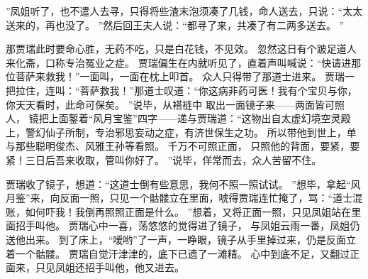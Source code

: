”凤姐听了，也不遣人去寻，只得将些渣末泡须凑了几钱，命人送去，只说：“太太送来的，再也没了。
”然后回王夫人说：“都寻了来，共凑了有二两多送去。
”\par
那贾瑞此时要命心胜，无药不吃，只是白花钱，不见效。
忽然这日有个跛足道人来化斋，口称专治冤业之症。
贾瑞偏生在内就听见了，直着声叫喊说：“快请进那位菩萨来救我！”一面叫，一面在枕上叩首。
众人只得带了那道士进来。
贾瑞一把拉住，连叫：“菩萨救我！”那道士叹道：“你这病非药可医！我有个宝贝与你，你天天看时，此命可保矣。
”说毕，从褡裢中
取出一面镜子来——两面皆可照人，
镜把上面錾着“风月宝鉴”四字——递与贾瑞道：“这物出自太虚幻境空灵殿上，警幻仙子所制，专治邪思妄动之症，有济世保生之功。
所以带他到世上，单与那些聪明俊杰、风雅王孙等看照。
千万不可照正面，
只照他的背面，要紧，要紧！三日后吾来收取，管叫你好了。
”说毕，佯常而去，众人苦留不住。
\par
贾瑞收了镜子，想道：“这道士倒有些意思，我何不照一照试试。
”想毕，拿起“风月鉴”来，向反面一照，只见一个骷髅立在里面，唬得贾瑞连忙掩了，骂：“道士混账，如何吓我！我倒再照照正面是什么。
”想着，又将正面一照，只见凤姐站在里面招手叫他。
贾瑞心中一喜，荡悠悠的觉得进了镜子，
与凤姐云雨一番，凤姐仍送他出来。
到了床上，“嗳哟”了一声，一睁眼，镜子从手里掉过来，仍是反面立着一个骷髅。
贾瑞自觉汗津津的，底下已遗了一滩精。
心中到底不足，又翻过正面来，只见凤姐还招手叫他，他又进去。
